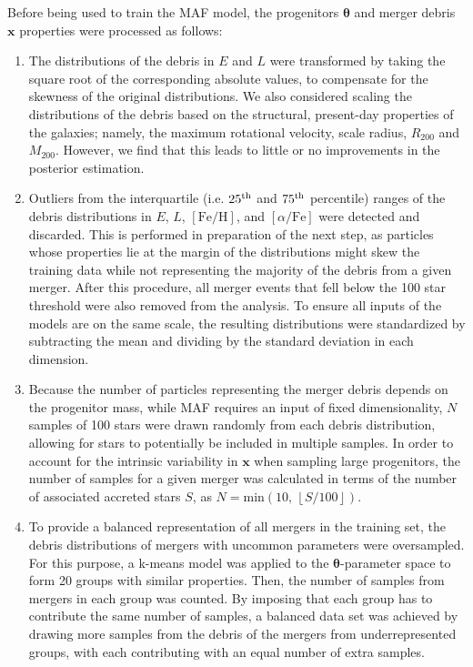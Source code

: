 Before being used to train the MAF model, the progenitors $\bm{\theta}$ and merger debris $\bm{x}$ properties were processed as follows:

\begin{enumerate}

    \item The distributions of the debris in $E$ and $L$ were transformed by taking the square root of the corresponding absolute values, to compensate for the skewness of the original distributions.
    We also considered scaling the distributions of the debris based on the structural, present-day properties of the galaxies; namely, the maximum rotational velocity, scale radius, $R_{200}$ and $M_{200}$. However, we find that this leads to little or no improvements in the posterior estimation.

    \item Outliers from the interquartile (i.e. $25^{\rm th}$ and $75^{\rm th}$ percentile) ranges of the debris distributions in $E$, $L$, $[\text{Fe}/\text{H}]$, and $[\alpha/\text{Fe}]$ were detected and discarded. This is performed in preparation of the next step, as particles whose properties lie at the margin of the distributions might skew the training data while not representing the majority of the debris from a given merger. After this procedure, all merger events that fell below the 100 star threshold were also removed from the analysis. 
    To ensure all inputs of the models are on the same scale, the resulting distributions were standardized by subtracting the mean and dividing by the standard deviation in each dimension.

    \item Because the number of particles representing the merger debris depends on the progenitor mass, while MAF requires an input of fixed dimensionality, $N$ samples of 100 stars were drawn randomly from each debris distribution, allowing for stars to potentially be included in multiple samples. In order to account for the intrinsic variability in $\bm{x}$ when sampling large progenitors, the number of samples for a given merger was calculated in terms of the number of associated accreted stars $S$, as $N=\mathrm{min}(10, \, \left \lfloor{S/100}\right \rfloor )$. 

    \item To provide a balanced representation of all mergers in the training set, the debris distributions of mergers with uncommon parameters were oversampled. For this purpose, a k-means model was applied to the $\bm{\theta}$-parameter space to form 20 groups with similar properties. Then, the number of samples from mergers in each group was counted. By imposing that each group has to contribute the same number of samples, a balanced data set was achieved by drawing more samples from the debris of the mergers from underrepresented groups, with each contributing with an equal number of extra samples.
    
\end{enumerate}


